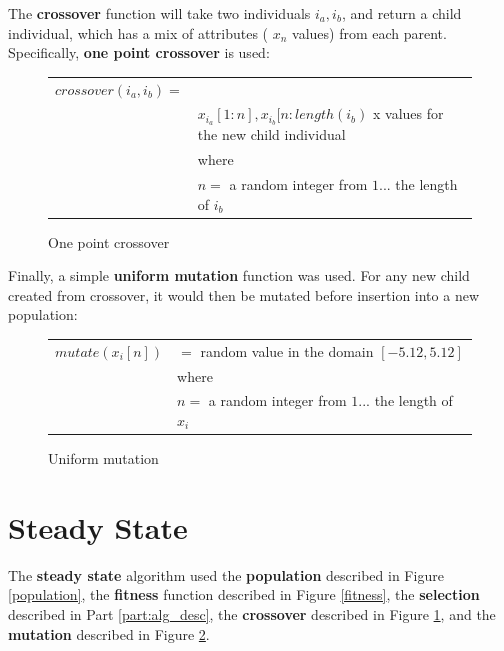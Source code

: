 \documentclass[12pt]{article}
\begin{document}
The \textbf{crossover} function will take two individuals $ i_a, i_b $, and return a child individual, which has a mix of attributes ( $x_n $ values) from each parent. Specifically, \textbf{one point crossover} is used:
\begin{figure}[!h]
        \begin{center}
		\begin{tabular}{r l}
	                $ crossover(i_a, i_b) = $ & \\
			& $ x_{i_a}[1:n], x_{i_b}[n:length(i_b) $ x values for the new child individual \\
								& where \\
								& $ n = $ a random integer from $ 1 ... $ the length of $i_b$
		\end{tabular} 
               	\caption{One point crossover}
                \label{one_crossover}
        \end{center}
\end{figure}

Finally, a simple \textbf{uniform mutation} function was used. For any new child created from crossover, it would then be mutated before insertion into a new population:
\begin{figure}[!h]
        \begin{center}
		\begin{tabular}{r l}
	                $ mutate(x_i[n]) $ 		& $ = $ random value in the domain $ [-5.12, 5.12] $\\
								& where \\
								& $ n = $ a random integer from $ 1 ... $ the length of $x_i$
		\end{tabular} 
               	\caption{Uniform mutation}
                \label{uniform_mutation}
        \end{center}
\end{figure}

\section{Steady State}
The \textbf{steady state} algorithm used the \textbf{population} described in Figure \ref{population}, the \textbf{fitness} function described in Figure \ref{fitness}, the \textbf{selection} described in Part \ref{part:alg_desc}, the \textbf{crossover} described in Figure \ref{one_crossover}, and the \textbf{mutation} described in Figure \ref{uniform_mutation}.
\end{document}

